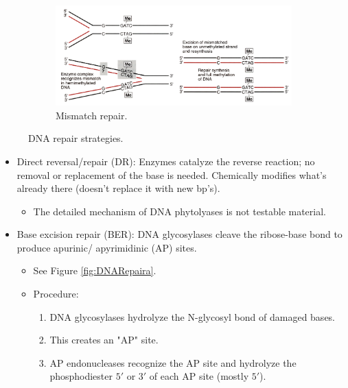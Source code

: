 \documentclass[../notes.tex]{subfiles}
\begin{document}
\begin{itemize}
\begin{figure}[H]
\begin{subfigure}[b]{0.63\linewidth}
            \label{fig:DNARepairb}
        \end{subfigure}
    \end{figure}
    \begin{figure}[H]
        \ContinuedFloat
        \centering
        \begin{subfigure}[b]{0.8\linewidth}
            \centering
            \includegraphics[width=0.9\linewidth]{../ExtFiles/DNARepairc.png}
            \caption{Mismatch repair.}
            \label{fig:DNARepairc}
        \end{subfigure}
        \caption{DNA repair strategies.}
        \label{fig:DNARepair}
    \end{figure}
    \begin{itemize}
        \item Direct reversal/repair (DR): Enzymes catalyze the reverse reaction; no removal or replacement of the base is needed. Chemically modifies what's already there (doesn't replace it with new bp's).
        \begin{itemize}
            \item The detailed mechanism of DNA phytolyases is not testable material.
        \end{itemize}
        \item Base excision repair (BER): DNA glycosylases cleave the ribose-base bond to produce apurinic/ apyrimidinic (AP) sites.
        \begin{itemize}
            \item See Figure \ref{fig:DNARepaira}.
            \item Procedure:
            \begin{enumerate}
                \item DNA glycosylases hydrolyze the N-glycosyl bond of damaged bases.
                \item This creates an "AP" site.
                \item AP endonucleases recognize the AP site and hydrolyze the phosphodiester $5'$ or $3'$ of each AP site (mostly $5'$).

\end{enumerate}
\end{itemize}
\end{itemize}
\end{itemize}
\end{document}
